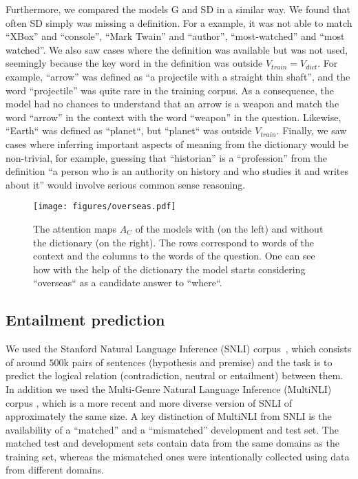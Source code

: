 Furthermore, we compared the models G and SD in a similar way. We found that often
SD simply was missing a definition. For a example, it was not able to match ``XBox'' and ``console'', ``Mark Twain'' and ``author'', ``most-watched'' and ``most watched''. We also saw cases where the definition was available but was not used, seemingly because the key word in the definition was outside $V_{train} = V_{dict}$. For example, ``arrow'' was defined as ``a projectile with a straight thin shaft'', and the word ``projectile'' was quite rare in the training corpus. As a consequence, the model had no chances to understand that an arrow is a weapon and match the word ``arrow'' in the context with the word ``weapon'' in the question. Likewise, ``Earth`` was defined as ``planet``, but ``planet`` was outside $V_{train}$. Finally, we saw cases where inferring important aspects of meaning from the dictionary would be non-trivial, for example, guessing that ``historian'' is a ``profession'' from the definition ``a person who is an authority on history and who studies it and writes about it'' would involve serious common sense reasoning.

\begin{figure}
\centering
\texttt{[image: figures/overseas.pdf]}
\caption{\label{fig:SQUAD_autumn_season}The attention maps $A_C$ of the models with (on the left) and without the dictionary (on the right). The rows correspond to words of the context and the columns to the words of the question. One can see how with the help of the dictionary the model starts considering ``overseas`` as a candidate answer to ``where``.}
\end{figure}


\subsection{Entailment prediction}

We used the Stanford Natural Language Inference (SNLI) corpus~\citep{bowman2015large}, which consists of around $500$k pairs of sentences (hypothesis and premise) and the task is to predict the logical relation (contradiction, neutral or entailment) between them. In addition we used the Multi-Genre Natural Language Inference (MultiNLI) corpus \citep{williams2017broad}, 
which  is a more recent and more diverse version of SNLI of approximately the same size. A key distinction of MultiNLI from SNLI is the availability of a ``matched'' and a ``mismatched'' development and test set. The matched test and development sets contain data from the same domains as the training set, whereas the mismatched ones were intentionally collected using data from different domains.

